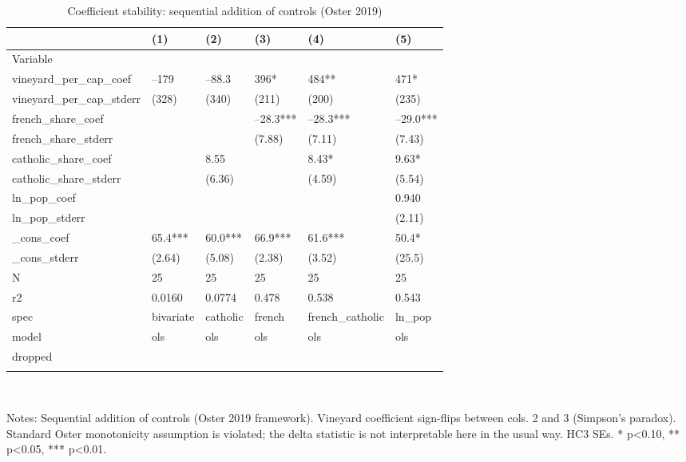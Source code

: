 \documentclass{article}
\begin{document}
\begin{table}[tbp] \centering
{}

\caption{Coefficient stability: sequential addition of controls (Oster 2019)}
\label{tab:stability}
\begin{tabularx}{\linewidth}{@{}lCCCCC@{}}

\toprule
&{(1)}&{(2)}&{(3)}&{(4)}&{(5)} \tabularnewline \midrule
{Variable}&{}&{}&{}&{}&{} \tabularnewline
\midrule \addlinespace[\belowrulesep]
vineyard\_per\_cap\_coef&--179&--88.3&396*&484**&471* \tabularnewline
vineyard\_per\_cap\_stderr&(328)&(340)&(211)&(200)&(235) \tabularnewline
french\_share\_coef&&&--28.3***&--28.3***&--29.0*** \tabularnewline
french\_share\_stderr&&&(7.88)&(7.11)&(7.43) \tabularnewline
catholic\_share\_coef&&8.55&&8.43*&9.63* \tabularnewline
catholic\_share\_stderr&&(6.36)&&(4.59)&(5.54) \tabularnewline
ln\_pop\_coef&&&&&0.940 \tabularnewline
ln\_pop\_stderr&&&&&(2.11) \tabularnewline
\_cons\_coef&65.4***&60.0***&66.9***&61.6***&50.4* \tabularnewline
\_cons\_stderr&(2.64)&(5.08)&(2.38)&(3.52)&(25.5) \tabularnewline
N&25&25&25&25&25 \tabularnewline
r2&0.0160&0.0774&0.478&0.538&0.543 \tabularnewline
spec&bivariate&catholic&french&french\_catholic&ln\_pop \tabularnewline
model&ols&ols&ols&ols&ols \tabularnewline
dropped&&&&& \tabularnewline
\bottomrule \addlinespace[\belowrulesep]

\end{tabularx}
\\ \parbox{\linewidth}{\footnotesize Notes: Sequential addition of controls (Oster 2019 framework). Vineyard coefficient sign-flips between cols. 2 and 3 (Simpson's paradox). Standard Oster monotonicity assumption is violated; the delta statistic is not interpretable here in the usual way. HC3 SEs. * p<0.10, ** p<0.05, *** p<0.01.}
\end{table}
\end{document}
